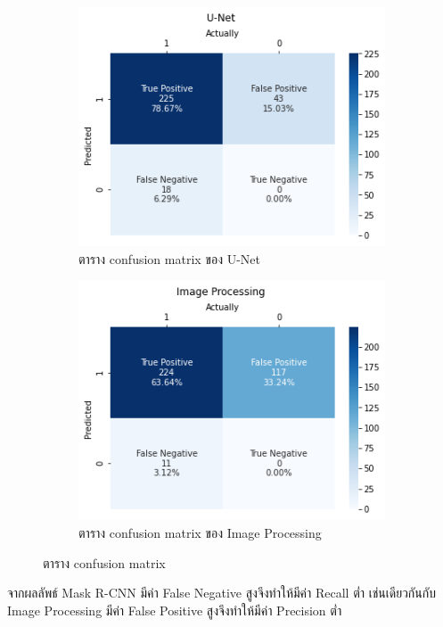 \documentclass[12pt,oneside,openright,a4paper]{cpe-thai-project}
\begin{document}
\begin{figure}[!h]
\begin{subfigure}[b]{0.42\textwidth}
    \end{subfigure}
    \\[1ex]
    \begin{subfigure}[b]{0.42\textwidth}
      \centering
        \includegraphics[width=\textwidth]{images/cmUNet.png}
        \caption{ตาราง confusion matrix ของ U-Net}\label{fig:cmUNet}
    \end{subfigure}
    \begin{subfigure}[b]{0.42\textwidth}
      \centering
        \includegraphics[width=\textwidth]{images/cmImageProcessing.png}
        \caption{ตาราง confusion matrix ของ Image Processing}\label{fig:cmImageProcessing}
    \end{subfigure}
    \caption{ตาราง confusion matrix}
    \label{fig:cm}
\end{figure}
จากผลลัพธ์ Mask R-CNN มีค่า False Negative สูงจึงทำให้มีค่า Recall ต่ำ เช่นเดียวกันกับ Image Processing มีค่า False Positive สูงจึงทำให้มีค่า Precision ต่ำ
\end{document}
